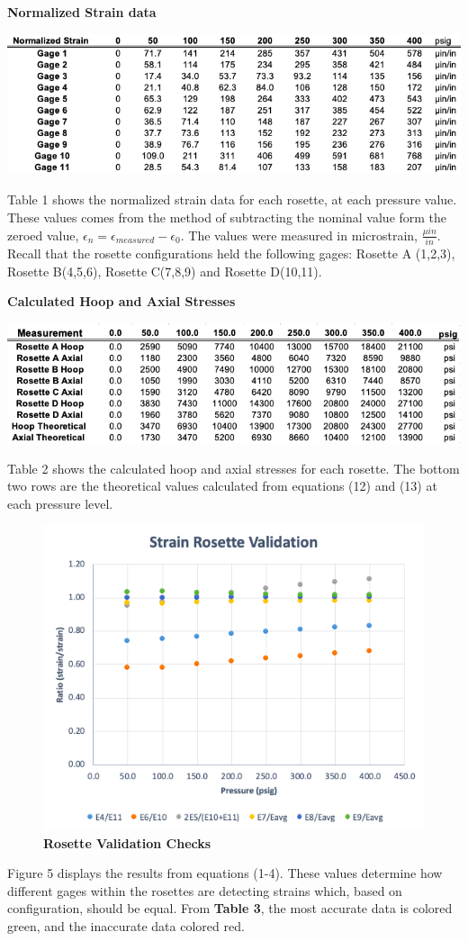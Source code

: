 \documentclass[12pt]{article}
\begin{document}
\begin{table}[H]
  \caption{\textbf{Normalized Strain data}} 
  \includegraphics[width=\linewidth]{table_raw_strain}
  \centering
\end{table}
Table 1 shows the normalized strain data for each  rosette, at each pressure value. These
values comes from the method of subtracting the nominal value form the zeroed value, 
$ \epsilon_n = \epsilon_{measured} - \epsilon_0 $. The 
values were measured in microstrain, $\frac{\mu in}{in} $. Recall that the rosette configurations
held the following gages: Rosette A (1,2,3), Rosette B(4,5,6), Rosette C(7,8,9) and Rosette D(10,11).

\begin{table}[H]
  \caption{\textbf{Calculated Hoop and Axial Stresses}}
  \includegraphics[width=\linewidth]{table_final_stress}
  \centering
\end{table}
Table 2 shows the calculated hoop and axial stresses for each rosette. The bottom two rows
are the theoretical values calculated from equations (12) and (13) at each pressure
level. 

\begin{figure} [H]
	\centering
	\includegraphics [width=.8\textwidth]{plot_rosette_validation}
	\caption{ \textbf{Rosette Validation Checks}}
\end{figure} 
Figure 5 displays the results from equations (1-4). These values determine how different gages within the rosettes are detecting strains which, based on configuration, should be equal.
From \textbf{Table 3}, the most accurate data is colored green, and the inaccurate data colored red. 
\end{document}
